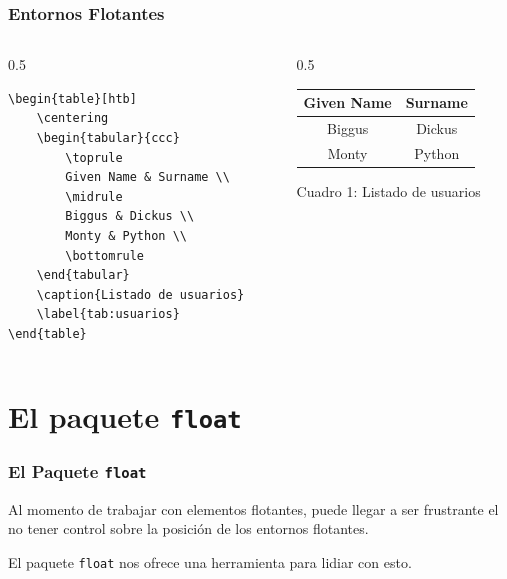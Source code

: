 \documentclass[12pt,aspectratio=169,ignorenonframetext]{ltxbeamer}
\begin{document}
\begin{frame}[fragile]
\frametitle{Entornos Flotantes}

\begin{columns}
    \begin{column}{0.5\textwidth}
        \begin{verbatim}
\begin{table}[htb]
    \centering
    \begin{tabular}{ccc}
        \toprule
        Given Name & Surname \\
        \midrule
        Biggus & Dickus \\
        Monty & Python \\
        \bottomrule
    \end{tabular}
    \caption{Listado de usuarios}
    \label{tab:usuarios}
\end{table}
        \end{verbatim}
    \end{column}
    {\color{gray}\vline}
    \begin{column}{0.5\textwidth}
        \lmr
        \centering
        \begin{tabular}{cc}
            \toprule
            Given Name & Surname \\
            \midrule
            Biggus & Dickus \\
            Monty & Python \\
            \bottomrule
        \end{tabular}

        \medskip
        \begingroup
        \centering
        Cuadro 1: Listado de usuarios\par
        \endgroup
    \end{column}
\end{columns}
\end{frame}







\section{El paquete \texttt{float}}

\begin{frame}
\frametitle{El Paquete \texttt{float}}

Al momento de trabajar con elementos flotantes, puede llegar a ser frustrante el no tener control sobre la posición de los entornos flotantes.

\pause

El paquete \texttt{float} nos ofrece una herramienta para lidiar con esto.
\end{frame}
\end{document}
